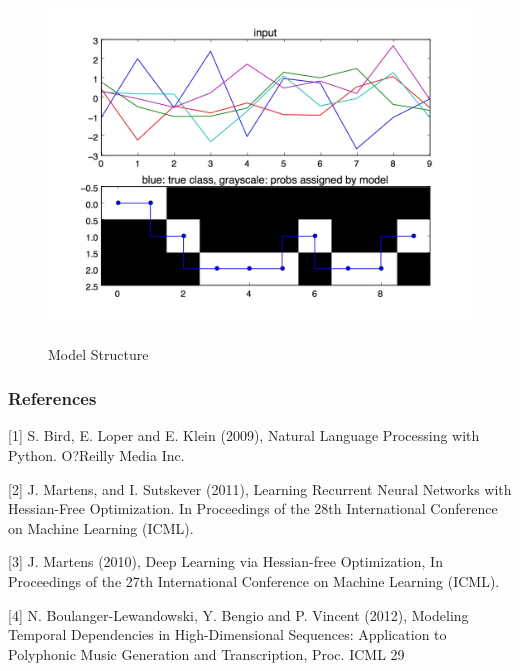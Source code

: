 \documentclass{article} %
\begin{document}
\begin{figure}
\centering
\caption{Model Structure}
\includegraphics[width=0.5\linewidth]{results.jpg}
\label{fig:structure}
\end{figure}

\subsubsection*{References}


\small{
[1] S. Bird, E. Loper and E. Klein (2009), Natural Language Processing with Python. O?Reilly Media Inc.

[2] J. Martens, and I. Sutskever (2011), Learning Recurrent Neural Networks with Hessian-Free Optimization. In Proceedings of the 28th International Conference on Machine Learning (ICML).

[3] J. Martens (2010), Deep Learning via Hessian-free Optimization, In Proceedings of the 27th International Conference on Machine Learning (ICML).

[4] N. Boulanger-Lewandowski, Y. Bengio and P. Vincent (2012), Modeling Temporal Dependencies in High-Dimensional Sequences: Application to Polyphonic Music Generation and Transcription, Proc. ICML 29
}
\end{document}
